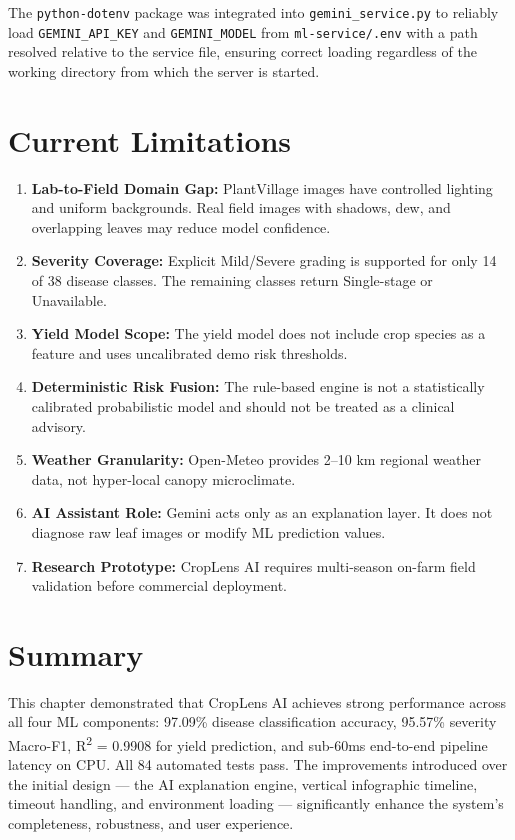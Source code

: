 The \texttt{python-dotenv} package was integrated into \texttt{gemini\_service.py} to reliably load \texttt{GEMINI\_API\_KEY} and \texttt{GEMINI\_MODEL} from \texttt{ml-service/.env} with a path resolved relative to the service file, ensuring correct loading regardless of the working directory from which the server is started.

\section{Current Limitations}

\begin{enumerate}
    \item \textbf{Lab-to-Field Domain Gap:} PlantVillage images have controlled lighting and uniform backgrounds. Real field images with shadows, dew, and overlapping leaves may reduce model confidence.
    \item \textbf{Severity Coverage:} Explicit Mild/Severe grading is supported for only 14 of 38 disease classes. The remaining classes return Single-stage or Unavailable.
    \item \textbf{Yield Model Scope:} The yield model does not include crop species as a feature and uses uncalibrated demo risk thresholds.
    \item \textbf{Deterministic Risk Fusion:} The rule-based engine is not a statistically calibrated probabilistic model and should not be treated as a clinical advisory.
    \item \textbf{Weather Granularity:} Open-Meteo provides 2--10 km regional weather data, not hyper-local canopy microclimate.
    \item \textbf{AI Assistant Role:} Gemini acts only as an explanation layer. It does not diagnose raw leaf images or modify ML prediction values.
    \item \textbf{Research Prototype:} CropLens AI requires multi-season on-farm field validation before commercial deployment.
\end{enumerate}

\section{Summary}

This chapter demonstrated that CropLens AI achieves strong performance across all four ML components: 97.09\% disease classification accuracy, 95.57\% severity Macro-F1, R\textsuperscript{2} = 0.9908 for yield prediction, and sub-60ms end-to-end pipeline latency on CPU. All 84 automated tests pass. The improvements introduced over the initial design --- the AI explanation engine, vertical infographic timeline, timeout handling, and environment loading --- significantly enhance the system's completeness, robustness, and user experience.

